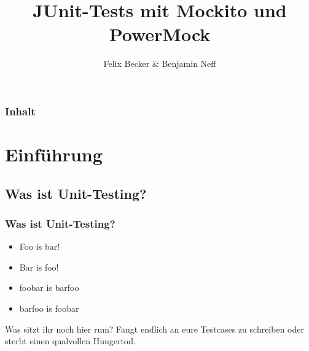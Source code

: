 \documentclass{beamer}
\title{JUnit-Tests mit Mockito und PowerMock}
\institute{Computerseminar Tondorf 2011}
\author[F. Becker, B. Neff]{
        Felix Becker \& 
	Benjamin Neff
}
\begin{document}
	\begin{frame}
		\titlepage
	\end{frame}


	\begin{frame}
		\frametitle{Inhalt}
		\tableofcontents
	\end{frame}

	\section{Einführung}
	\subsection{Was ist Unit-Testing?}
	\begin{frame}
		\frametitle{Was ist Unit-Testing?}
		\begin{itemize}
			\item{Foo is bar!}
			\item{Bar is foo!}
			\pause
			\item{foobar is barfoo}
			\item{barfoo is foobar}
		\end{itemize}
	\end{frame}

	\begin{frame}
		Was sitzt ihr noch hier rum? Fangt endlich an eure Testcases zu schreiben oder sterbt einen qualvollen Hungertod.
	\end{frame}
\end{document}
